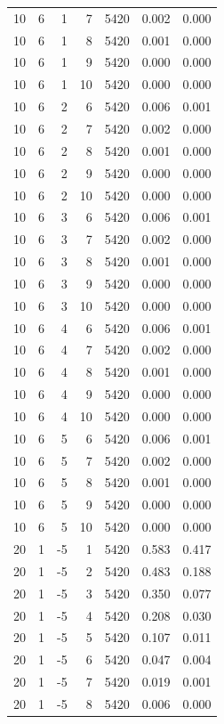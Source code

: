 \begin{table}
\begin{tabular}{rrrrrrr}
10 & 6 & 1 & 7 & 5420 & 0.002 & 0.000 \\
10 & 6 & 1 & 8 & 5420 & 0.001 & 0.000 \\
10 & 6 & 1 & 9 & 5420 & 0.000 & 0.000 \\
10 & 6 & 1 & 10 & 5420 & 0.000 & 0.000 \\
10 & 6 & 2 & 6 & 5420 & 0.006 & 0.001 \\
10 & 6 & 2 & 7 & 5420 & 0.002 & 0.000 \\
10 & 6 & 2 & 8 & 5420 & 0.001 & 0.000 \\
10 & 6 & 2 & 9 & 5420 & 0.000 & 0.000 \\
10 & 6 & 2 & 10 & 5420 & 0.000 & 0.000 \\
10 & 6 & 3 & 6 & 5420 & 0.006 & 0.001 \\
10 & 6 & 3 & 7 & 5420 & 0.002 & 0.000 \\
10 & 6 & 3 & 8 & 5420 & 0.001 & 0.000 \\
10 & 6 & 3 & 9 & 5420 & 0.000 & 0.000 \\
10 & 6 & 3 & 10 & 5420 & 0.000 & 0.000 \\
10 & 6 & 4 & 6 & 5420 & 0.006 & 0.001 \\
10 & 6 & 4 & 7 & 5420 & 0.002 & 0.000 \\
10 & 6 & 4 & 8 & 5420 & 0.001 & 0.000 \\
10 & 6 & 4 & 9 & 5420 & 0.000 & 0.000 \\
10 & 6 & 4 & 10 & 5420 & 0.000 & 0.000 \\
10 & 6 & 5 & 6 & 5420 & 0.006 & 0.001 \\
10 & 6 & 5 & 7 & 5420 & 0.002 & 0.000 \\
10 & 6 & 5 & 8 & 5420 & 0.001 & 0.000 \\
10 & 6 & 5 & 9 & 5420 & 0.000 & 0.000 \\
10 & 6 & 5 & 10 & 5420 & 0.000 & 0.000 \\
20 & 1 & -5 & 1 & 5420 & 0.583 & 0.417 \\
20 & 1 & -5 & 2 & 5420 & 0.483 & 0.188 \\
20 & 1 & -5 & 3 & 5420 & 0.350 & 0.077 \\
20 & 1 & -5 & 4 & 5420 & 0.208 & 0.030 \\
20 & 1 & -5 & 5 & 5420 & 0.107 & 0.011 \\
20 & 1 & -5 & 6 & 5420 & 0.047 & 0.004 \\
20 & 1 & -5 & 7 & 5420 & 0.019 & 0.001 \\
20 & 1 & -5 & 8 & 5420 & 0.006 & 0.000 \\

\end{tabular}
\end{table}
